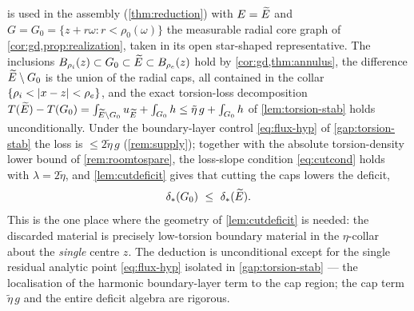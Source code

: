 \begin{remark}\label{rem:twouses}
 is used in the assembly (\cref{thm:reduction}) with
$E=\widetilde{E}$ and $G=G_0=\{z+r\omega:r<\rho_0(\omega)\}$ the measurable radial
core graph of \cref{cor:gd,prop:realization}, taken in its open star-shaped
representative. The inclusions $B_{\rho_i}(z)\subset G_0\subset\widetilde{E}\subset
B_{\rho_e}(z)$ hold by \cref{cor:gd,thm:annulus}, the difference
$\widetilde{E}\setminus G_0$ is the union of the radial caps, all contained in the
collar $\{\rho_i<\left\lvert x-z\right\rvert<\rho_e\}$, and the exact torsion-loss decomposition
$T(\widetilde{E})-T(G_0)=\int_{\widetilde{E}\setminus G_0}u_{\widetilde{E}}+\int_{G_0}h\le\tilde\eta\,g
+\int_{G_0}h$ of \cref{lem:torsion-stab} holds unconditionally. Under the
boundary-layer control \eqref{eq:flux-hyp} of \cref{gap:torsion-stab} the loss
is $\le2\tilde\eta\,g$ (\cref{rem:supply}); together with the absolute
torsion-density lower bound of \cref{rem:roomtospare}, the loss-slope
condition \eqref{eq:cutcond} holds with $\lambda=2\tilde\eta$, and
\cref{lem:cutdeficit} gives that cutting the caps lowers the deficit,
\[
   \dstar(G_0)\ \le\ \dstar(\Etil).
\]
This is the one place where the geometry of \cref{lem:cutdeficit} is needed:
the discarded material is precisely low-torsion boundary material in the
$\eta$-collar about the \emph{single} centre $z$. The deduction is
unconditional except for the single residual analytic point \eqref{eq:flux-hyp}
isolated in \cref{gap:torsion-stab} --- the localisation of the harmonic
boundary-layer term to the cap region; the cap term $\tilde\eta\,g$ and the
entire deficit algebra are rigorous.
\end{remark}

